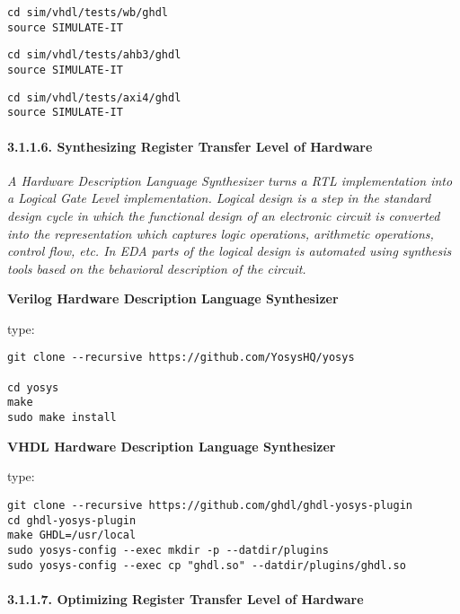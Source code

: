 \documentclass[]{article}
\let\oldparagraph\paragraph
\renewcommand{\paragraph}[1]{\oldparagraph{#1}\mbox{}}
\begin{document}
\begin{verbatim}
cd sim/vhdl/tests/wb/ghdl
source SIMULATE-IT
\end{verbatim}

\begin{verbatim}
cd sim/vhdl/tests/ahb3/ghdl
source SIMULATE-IT
\end{verbatim}

\begin{verbatim}
cd sim/vhdl/tests/axi4/ghdl
source SIMULATE-IT
\end{verbatim}

\hypertarget{synthesizing-register-transfer-level-of-hardware}{%
\paragraph{3.1.1.6. Synthesizing Register Transfer Level of
Hardware}\label{synthesizing-register-transfer-level-of-hardware}}

\emph{A Hardware Description Language Synthesizer turns a RTL
implementation into a Logical Gate Level implementation. Logical design
is a step in the standard design cycle in which the functional design of
an electronic circuit is converted into the representation which
captures logic operations, arithmetic operations, control flow, etc. In
EDA parts of the logical design is automated using synthesis tools based
on the behavioral description of the circuit.}

\textbf{Verilog Hardware Description Language Synthesizer}

type:

\begin{verbatim}
git clone --recursive https://github.com/YosysHQ/yosys

cd yosys
make
sudo make install
\end{verbatim}

\textbf{VHDL Hardware Description Language Synthesizer}

type:

\begin{verbatim}
git clone --recursive https://github.com/ghdl/ghdl-yosys-plugin
cd ghdl-yosys-plugin
make GHDL=/usr/local
sudo yosys-config --exec mkdir -p --datdir/plugins
sudo yosys-config --exec cp "ghdl.so" --datdir/plugins/ghdl.so
\end{verbatim}

\hypertarget{optimizing-register-transfer-level-of-hardware}{%
\paragraph{3.1.1.7. Optimizing Register Transfer Level of
Hardware}\label{optimizing-register-transfer-level-of-hardware}}
\end{document}
